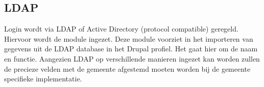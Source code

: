 \subsection{LDAP}\label{ldap}

Login wordt via LDAP of Active Directory (protocol compatible) geregeld. Hiervoor wordt de  module ingezet. Deze module voorziet in het importeren van gegevens uit de LDAP database in het Drupal profiel. Het gaat hier om de naam en functie. Aangezien LDAP op verschillende manieren ingezet kan worden zullen de precieze velden met de gemeente afgestemd moeten worden bij de gemeente specifieke implementatie.
